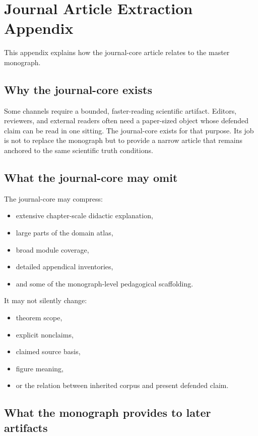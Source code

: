 \section{Journal Article Extraction Appendix}
\label{sec:oc13-journal-core-bridge}

This appendix explains how the journal-core article relates to the master monograph.

\subsection{Why the journal-core exists}

Some channels require a bounded, faster-reading scientific artifact.
Editors, reviewers, and external readers often need a paper-sized object whose defended claim can
be read in one sitting.
The journal-core exists for that purpose.
Its job is not to replace the monograph but to provide a narrow article that remains anchored to
the same scientific truth conditions.

\subsection{What the journal-core may omit}

The journal-core may compress:

\begin{itemize}
\item extensive chapter-scale didactic explanation,
\item large parts of the domain atlas,
\item broad module coverage,
\item detailed appendical inventories,
\item and some of the monograph-level pedagogical scaffolding.
\end{itemize}

It may not silently change:

\begin{itemize}
\item theorem scope,
\item explicit nonclaims,
\item claimed source basis,
\item figure meaning,
\item or the relation between inherited corpus and present defended claim.
\end{itemize}

\subsection{What the monograph provides to later artifacts}

